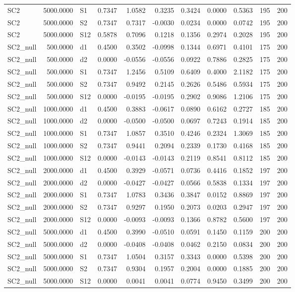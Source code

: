 \begin{tabular}{lrlrrrrrrrr}
  SC2 & 5000.0000 & S1 & 0.7347 & 1.0582 & 0.3235 & 0.3424 & 0.0000 & 0.5363 &   195 &   200 \\ 
  SC2 & 5000.0000 & S2 & 0.7347 & 0.7317 & -0.0030 & 0.0234 & 0.0000 & 0.0742 &   195 &   200 \\ 
  SC2 & 5000.0000 & S12 & 0.5878 & 0.7096 & 0.1218 & 0.1356 & 0.2974 & 0.2028 &   195 &   200 \\ 
  SC2\_null & 500.0000 & d1 & 0.4500 & 0.3502 & -0.0998 & 0.1344 & 0.6971 & 0.4101 &   175 &   200 \\ 
  SC2\_null & 500.0000 & d2 & 0.0000 & -0.0556 & -0.0556 & 0.0922 & 0.7886 & 0.2825 &   175 &   200 \\ 
  SC2\_null & 500.0000 & S1 & 0.7347 & 1.2456 & 0.5109 & 0.6409 & 0.4000 & 2.1182 &   175 &   200 \\ 
  SC2\_null & 500.0000 & S2 & 0.7347 & 0.9492 & 0.2145 & 0.2626 & 0.5486 & 0.5934 &   175 &   200 \\ 
  SC2\_null & 500.0000 & S12 & 0.0000 & -0.0195 & -0.0195 & 0.2902 & 0.9086 & 1.2106 &   175 &   200 \\ 
  SC2\_null & 1000.0000 & d1 & 0.4500 & 0.3883 & -0.0617 & 0.0890 & 0.6162 & 0.2727 &   185 &   200 \\ 
  SC2\_null & 1000.0000 & d2 & 0.0000 & -0.0500 & -0.0500 & 0.0697 & 0.7243 & 0.1914 &   185 &   200 \\ 
  SC2\_null & 1000.0000 & S1 & 0.7347 & 1.0857 & 0.3510 & 0.4246 & 0.2324 & 1.3069 &   185 &   200 \\ 
  SC2\_null & 1000.0000 & S2 & 0.7347 & 0.9441 & 0.2094 & 0.2339 & 0.1730 & 0.4168 &   185 &   200 \\ 
  SC2\_null & 1000.0000 & S12 & 0.0000 & -0.0143 & -0.0143 & 0.2119 & 0.8541 & 0.8112 &   185 &   200 \\ 
  SC2\_null & 2000.0000 & d1 & 0.4500 & 0.3929 & -0.0571 & 0.0736 & 0.4416 & 0.1852 &   197 &   200 \\ 
  SC2\_null & 2000.0000 & d2 & 0.0000 & -0.0427 & -0.0427 & 0.0566 & 0.5838 & 0.1334 &   197 &   200 \\ 
  SC2\_null & 2000.0000 & S1 & 0.7347 & 1.0783 & 0.3436 & 0.3847 & 0.0152 & 0.8869 &   197 &   200 \\ 
  SC2\_null & 2000.0000 & S2 & 0.7347 & 0.9297 & 0.1950 & 0.2073 & 0.0203 & 0.2947 &   197 &   200 \\ 
  SC2\_null & 2000.0000 & S12 & 0.0000 & -0.0093 & -0.0093 & 0.1366 & 0.8782 & 0.5600 &   197 &   200 \\ 
  SC2\_null & 5000.0000 & d1 & 0.4500 & 0.3990 & -0.0510 & 0.0591 & 0.1450 & 0.1159 &   200 &   200 \\ 
  SC2\_null & 5000.0000 & d2 & 0.0000 & -0.0408 & -0.0408 & 0.0462 & 0.2150 & 0.0834 &   200 &   200 \\ 
  SC2\_null & 5000.0000 & S1 & 0.7347 & 1.0504 & 0.3157 & 0.3343 & 0.0000 & 0.5398 &   200 &   200 \\ 
  SC2\_null & 5000.0000 & S2 & 0.7347 & 0.9304 & 0.1957 & 0.2004 & 0.0000 & 0.1885 &   200 &   200 \\ 
  SC2\_null & 5000.0000 & S12 & 0.0000 & 0.0041 & 0.0041 & 0.0774 & 0.9450 & 0.3499 &   200 &   200 \\ 
   \hline
\end{tabular}
